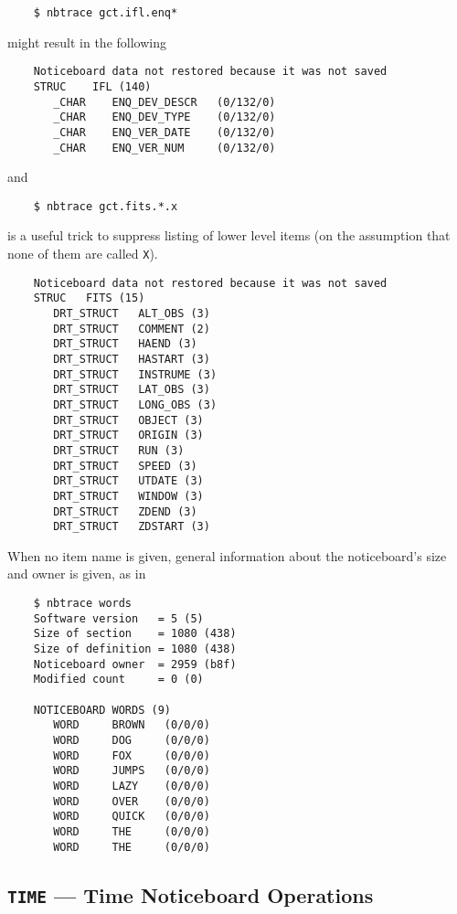 \documentclass[twoside,11pt]{article}
\renewcommand{\_}{\texttt{\symbol{95}}}
\begin{document}
\begin{verbatim}
    $ nbtrace gct.ifl.enq*
\end{verbatim}

might result in the following

\begin{verbatim}
    Noticeboard data not restored because it was not saved
    STRUC    IFL (140)
       _CHAR    ENQ_DEV_DESCR   (0/132/0)
       _CHAR    ENQ_DEV_TYPE    (0/132/0)
       _CHAR    ENQ_VER_DATE    (0/132/0)
       _CHAR    ENQ_VER_NUM     (0/132/0)
\end{verbatim}

and

\begin{verbatim}
    $ nbtrace gct.fits.*.x
\end{verbatim}

is a useful trick to suppress listing of lower level items (on the assumption
that none of them are called {\tt X}).

\begin{verbatim}
    Noticeboard data not restored because it was not saved
    STRUC   FITS (15)
       DRT_STRUCT   ALT_OBS (3)
       DRT_STRUCT   COMMENT (2)
       DRT_STRUCT   HAEND (3)
       DRT_STRUCT   HASTART (3)
       DRT_STRUCT   INSTRUME (3)
       DRT_STRUCT   LAT_OBS (3)
       DRT_STRUCT   LONG_OBS (3)
       DRT_STRUCT   OBJECT (3)
       DRT_STRUCT   ORIGIN (3)
       DRT_STRUCT   RUN (3)
       DRT_STRUCT   SPEED (3)
       DRT_STRUCT   UTDATE (3)
       DRT_STRUCT   WINDOW (3)
       DRT_STRUCT   ZDEND (3)
       DRT_STRUCT   ZDSTART (3)
\end{verbatim}

When no item name is given, general information about the noticeboard's size
and owner is given, as in

\begin {verbatim}
    $ nbtrace words
    Software version   = 5 (5)
    Size of section    = 1080 (438)
    Size of definition = 1080 (438)
    Noticeboard owner  = 2959 (b8f)
    Modified count     = 0 (0)

    NOTICEBOARD WORDS (9)
       WORD     BROWN   (0/0/0)
       WORD     DOG     (0/0/0)
       WORD     FOX     (0/0/0)
       WORD     JUMPS   (0/0/0)
       WORD     LAZY    (0/0/0)
       WORD     OVER    (0/0/0)
       WORD     QUICK   (0/0/0)
       WORD     THE     (0/0/0)
       WORD     THE     (0/0/0)
\end{verbatim}

\subsection {{\tt TIME} --- Time Noticeboard Operations}
\end{document}
